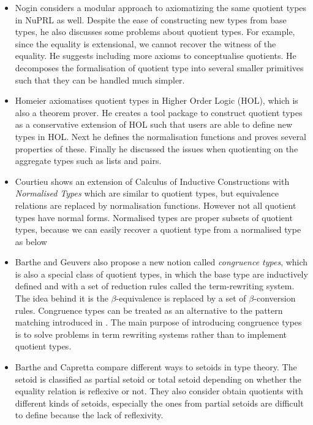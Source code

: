 \begin{itemize}
\item Nogin \cite{nog:02} considers a modular approach to axiomatizing the
same quotient types in NuPRL as well. Despite the ease of constructing new types
from base types, he also discusses some
problems about quotient types. For example, since the equality is
extensional, we cannot recover the
witness of the equality.  He suggests including more axioms to
conceptualise quotients. He decomposes the formalisation of quotient type
into several smaller primitives such that they can be handled much
simpler.

\item Homeier \cite{hom} axiomatises quotient types in Higher Order Logic
(HOL), which is also a theorem prover. He creates a tool package to
construct quotient types as a conservative extension of HOL such that
users are able to define new types in HOL. Next he defines the
normalisation functions and proves several properties of
these. Finally he discussed the issues when quotienting on the
aggregate types such as lists and pairs.


\item Courtieu \cite{cou:01} shows an extension of Calculus of Inductive Constructions
with \emph{Normalised Types} which are similar to quotient types, but equivalence relations are replaced by normalisation functions. 
However not all quotient types have normal forms. Normalised types are
proper subsets of quotient types, because we can easily recover a quotient
type from a normalised type as below


\item Barthe and Geuvers \cite{bar:96} also propose a new notion called
\emph{congruence types}, which is also a special class of quotient
types, in which the base type are inductively defined and with a set
of reduction rules called the term-rewriting system. The idea behind
it is the $\beta$-equivalence is replaced by a set of
$\beta$-conversion rules. Congruence types can be treated as an
alternative to the pattern matching introduced in \cite{coq:92}. The main
purpose of introducing congruence types is to solve problems in
term rewriting systems rather than to implement quotient types.


\item Barthe and Capretta \cite{bar:03} compare different ways to setoids in type theory.
The setoid is classified as partial setoid or total setoid depending
on whether the equality relation is reflexive or not. They also
consider obtain quotients with different kinds of setoids, especially
the ones from partial setoids are difficult to define because the lack
of reflexivity.


\end{itemize}
